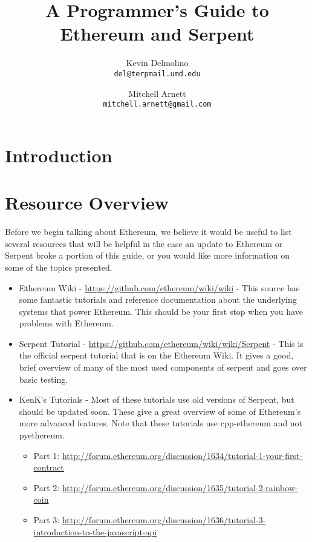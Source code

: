 \documentclass[12pt]{article}
\begin{document}
\title{A Programmer's Guide to Ethereum and Serpent}

\author{
  Kevin Delmolino\\
  \texttt{del@terpmail.umd.edu}
  \and
  Mitchell Arnett\\
  \texttt{mitchell.arnett@gmail.com}
}

\maketitle

\setcounter{tocdepth}{5}
\tableofcontents

\section{Introduction}

\section{Resource Overview}

Before we begin talking about Ethereum, we believe it would be useful to list several resources that will be helpful in the case an update to Ethereum or Serpent broke a portion of this guide, or you would like more information on some of the topics presented. 

\begin{itemize}
	\item Ethereum Wiki - \url{https://github.com/ethereum/wiki/wiki} - This source has some fantastic tutorials and reference documentation about the underlying systems that power Ethereum. This should be your first stop when you have problems with Ethereum.
	\item Serpent Tutorial - \url{https://github.com/ethereum/wiki/wiki/Serpent} - This is the official serpent tutorial that is on the Ethereum Wiki. It gives a good, brief overview of many of the most used components of serpent and goes over basic testing.
	\item KenK's Tutorials - Most of these tutorials use old versions of Serpent, but should be updated soon. These give a great overview of some of Ethereum's more advanced features. Note that these tutorials use cpp-ethereum and not pyethereum.
	\begin{itemize}
	\item Part 1: \url{http://forum.ethereum.org/discussion/1634/tutorial-1-your-first-contract}
	\item Part 2: \url{http://forum.ethereum.org/discussion/1635/tutorial-2-rainbow-coin}
	\item Part 3: \url{http://forum.ethereum.org/discussion/1636/tutorial-3-introduction-to-the-javascript-api}
	\end{itemize}
\end{itemize}
\end{document}
